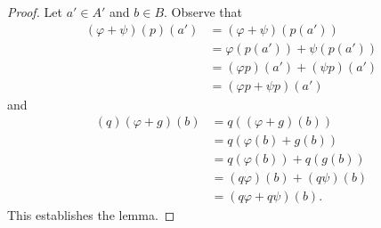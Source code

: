 \begin{proof}
            Let $a' \in A'$ and $b \in B$. Observe that 
                \begin{equation*}
                \begin{split}
                    (\varphi+\psi)(p)(a')
                    & = (\varphi+\psi)(p(a')) \\
                    & = \varphi(p(a')) + \psi(p(a')) \\
                    & = (\varphi p)(a') + (\psi p)(a')\\
                    & = (\varphi p + \psi p)(a')
                \end{split}
                \end{equation*}
            and
                \begin{equation*}
                \begin{split}
                    (q)(\varphi+g)(b)
                    & = q((\varphi+g)(b))\\
                    & = q(\varphi(b) + g(b))\\
                    & = q(\varphi(b)) + q(g(b))\\
                    & = (q\varphi)(b) + (q\psi)(b)\\
                    & = (q\varphi + q\psi)(b).
                \end{split}
                \end{equation*}
            This establishes the lemma.
        \end{proof}

